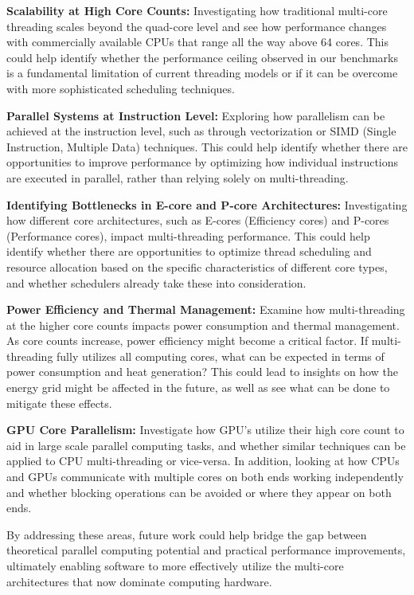 \documentclass[12pt,a4paper]{article}
\begin{document}
\textbf{Scalability at High Core Counts:} Investigating how traditional multi-core threading scales beyond the quad-core level and see how performance changes with commercially available CPUs that range all the way above 64 cores. This could help identify whether the performance ceiling observed in our benchmarks is a fundamental limitation of current threading models or if it can be overcome with more sophisticated scheduling techniques.

\textbf{Parallel Systems at Instruction Level:} Exploring how parallelism can be achieved at the instruction level, such as through vectorization or SIMD (Single Instruction, Multiple Data) techniques. This could help identify whether there are opportunities to improve performance by optimizing how individual instructions are executed in parallel, rather than relying solely on multi-threading.

\textbf{Identifying Bottlenecks in E-core and P-core Architectures:} Investigating how different core architectures, such as E-cores (Efficiency cores) and P-cores (Performance cores), impact multi-threading performance. This could help identify whether there are opportunities to optimize thread scheduling and resource allocation based on the specific characteristics of different core types, and whether schedulers already take these into consideration. 

\textbf{Power Efficiency and Thermal Management:} Examine how multi-threading at the higher core counts impacts power consumption and thermal management. As core counts increase, power efficiency might become a critical factor. If multi-threading fully utilizes all computing cores, what can be expected in terms of power consumption and heat generation? This could lead to insights on how the energy grid might be affected in the future, as well as see what can be done to mitigate these effects.

\textbf{GPU Core Parallelism:} Investigate how GPU's utilize their high core count to aid in large scale parallel computing tasks, and whether similar techniques can be applied to CPU multi-threading or vice-versa. In addition, looking at how CPUs and GPUs communicate with multiple cores on both ends working independently and whether blocking operations can be avoided or where they appear on both ends.

By addressing these areas, future work could help bridge the gap between theoretical parallel computing potential and practical performance improvements, ultimately enabling software to more effectively utilize the multi-core architectures that now dominate computing hardware.
\end{document}
